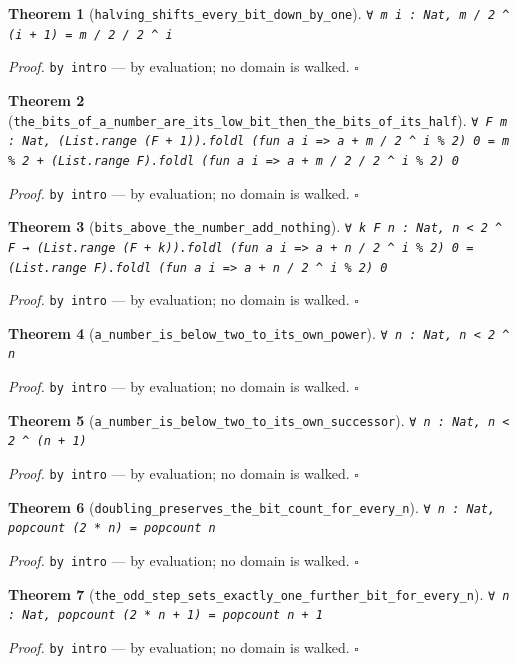\documentclass[11pt]{article}
\newtheorem{theorem}{Theorem}[section]
\begin{document}
\begin{theorem}[\texttt{halving\_shifts\_every\_bit\_down\_by\_one}]
\texttt{∀ m i : Nat, m / 2 ^ (i + 1) = m / 2 / 2 ^ i}
\end{theorem}
\noindent\emph{Proof.} \texttt{by
  intro} --- by evaluation; no domain is walked. \hfill$\square$

\begin{theorem}[\texttt{the\_bits\_of\_a\_number\_are\_its\_low\_bit\_then\_the\_bits\_of\_its\_half}]
\texttt{∀ F m : Nat, (List.range (F + 1)).foldl (fun a i => a + m / 2 ^ i \% 2) 0 = m \% 2 + (List.range F).foldl (fun a i => a + m / 2 / 2 ^ i \% 2) 0}
\end{theorem}
\noindent\emph{Proof.} \texttt{by
  intro} --- by evaluation; no domain is walked. \hfill$\square$

\begin{theorem}[\texttt{bits\_above\_the\_number\_add\_nothing}]
\texttt{∀ k F n : Nat, n < 2 ^ F → (List.range (F + k)).foldl (fun a i => a + n / 2 ^ i \% 2) 0 = (List.range F).foldl (fun a i => a + n / 2 ^ i \% 2) 0}
\end{theorem}
\noindent\emph{Proof.} \texttt{by
  intro} --- by evaluation; no domain is walked. \hfill$\square$

\begin{theorem}[\texttt{a\_number\_is\_below\_two\_to\_its\_own\_power}]
\texttt{∀ n : Nat, n < 2 ^ n}
\end{theorem}
\noindent\emph{Proof.} \texttt{by
  intro} --- by evaluation; no domain is walked. \hfill$\square$

\begin{theorem}[\texttt{a\_number\_is\_below\_two\_to\_its\_own\_successor}]
\texttt{∀ n : Nat, n < 2 ^ (n + 1)}
\end{theorem}
\noindent\emph{Proof.} \texttt{by
  intro} --- by evaluation; no domain is walked. \hfill$\square$

\begin{theorem}[\texttt{doubling\_preserves\_the\_bit\_count\_for\_every\_n}]
\texttt{∀ n : Nat, popcount (2 * n) = popcount n}
\end{theorem}
\noindent\emph{Proof.} \texttt{by
  intro} --- by evaluation; no domain is walked. \hfill$\square$

\begin{theorem}[\texttt{the\_odd\_step\_sets\_exactly\_one\_further\_bit\_for\_every\_n}]
\texttt{∀ n : Nat, popcount (2 * n + 1) = popcount n + 1}
\end{theorem}
\noindent\emph{Proof.} \texttt{by
  intro} --- by evaluation; no domain is walked. \hfill$\square$
\end{document}
